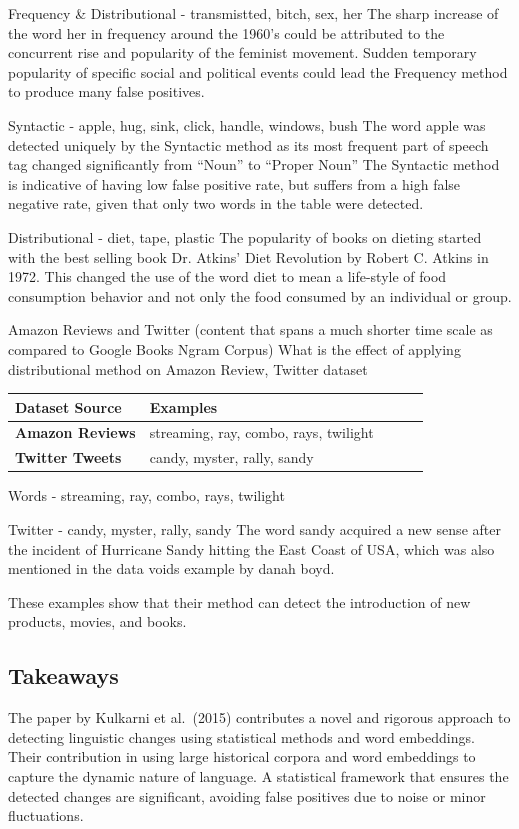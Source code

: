 Frequency \& Distributional - transmistted, bitch, sex, her
The sharp increase of the word her in frequency around the 1960’s could be attributed to the concurrent rise and popularity of the feminist movement.
Sudden temporary popularity of specific social and political events could lead the Frequency method to produce many false positives.

Syntactic - apple, hug, sink, click, handle, windows, bush
The word apple was detected uniquely by the Syntactic method as its most frequent part of speech tag changed significantly from “Noun” to “Proper Noun”
The Syntactic method is indicative of having low false positive rate, but suffers from a high false negative rate, given that only two words in the table were detected.

Distributional - diet, tape, plastic
The popularity of books on dieting started with the best selling book Dr. Atkins’ Diet Revolution by Robert C. Atkins in 1972.
This changed the use of the word diet to mean a life-style of food consumption behavior and not only the food consumed by an individual or group.

Amazon Reviews and Twitter (content that spans a much shorter time scale as compared to Google Books Ngram Corpus)
What is the effect of applying distributional method on Amazon Review, Twitter dataset


\begin{table}[]
\begin{tabular}{@{}lllll@{}}
\toprule
\textbf{Dataset Source} & \textbf{Examples}                     &  &  &  \\ \midrule
\textbf{Amazon Reviews} & streaming, ray, combo, rays, twilight &  &  &  \\
\textbf{Twitter Tweets} & candy, myster, rally, sandy           &  &  &  \\ \bottomrule
\end{tabular}\label{tab:sources-examples}
\end{table}

Words - streaming, ray, combo, rays, twilight

Twitter - candy, myster, rally, sandy
The word sandy acquired a new sense after the incident of Hurricane Sandy hitting the East Coast of USA, which was also mentioned in the data voids example by danah boyd.

These examples show that their method can detect the introduction of new products, movies, and books.

\subsection{Takeaways} \label{subsec:kulkarni-takeaways}
The paper by Kulkarni et al.\ (2015) contributes a novel and rigorous approach to detecting linguistic changes using statistical methods and word embeddings.
Their contribution in using large historical corpora and word embeddings to capture the dynamic nature of language.
A statistical framework that ensures the detected changes are significant, avoiding false positives due to noise or minor fluctuations.

